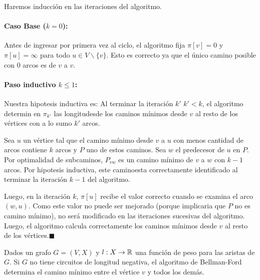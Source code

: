 \begin{demo}
  Haremos inducción en las iteraciones del algoritmo.

  \paragraph{Caso Base (\(k=0\)):} Antes de ingresar por primera vez al ciclo, el algoritmo fija \(\pi[v] = 0\) y \(\pi[u] = \infty\) para todo \(u\in V\backslash \{v\}\). Esto es correcto ya que el único camino posible con 0 arcos es de \(v\) a \(v\).

  \paragraph{Paso inductivo \(k \leq 1\):} Nuestra hipotesis inductiva es: Al terminar la iteración \(k'\) \( k' < k\), el algoritmo determin en \(\pi_{k'}\) las longitudesde los caminos mínimos desde \(v\) al resto de los vértices con a lo sumo \(k'\) arcos.

  Sea \(u\) un vértice tal que el camino mínimo desde \(v\) a \(u\) con menos cantidad de arcos contiene \(k\) arcos y \(P\) uno de estos caminos. Sea \(w\) el predecesor de \(u\) en \(P\). Por optimalidad de subcaminos, \(P_{vw}\) es un camino mínimo de \(v\) a \(w\) con \(k-1\) arcos. Por hipotesis inductiva, este caminoesta correctamente identificado al terminar la iteración \(k-1\) del algoritmo.

  Luego, en la iteración \(k\), \(\pi[u]\) recibe el valor correcto cuando se examina el arco \((w,u)\). Como este valor no puede ser mejorado (porque implicaria que \(P\) no es camino mínimo), no será modificado en las iteraciones sucesivas del algoritmo. Luego, el algoritmo calcula correctamente los caminos mínimos desde \(v\) al resto de los vértices.\hfill\(\blacksquare\)
\end{demo}

\begin{theorem}
  Dados un grafo \(G = (V,X)\) y \(l:X\to\mathbb{R}\) una función de peso para las aristas de \(G\). Si \(G\) no tiene circuitos de longitud negativa, el algoritmo de Bellman-Ford determina el camino mínimo entre el vértice \(v\) y todos los demás.
\end{theorem}
